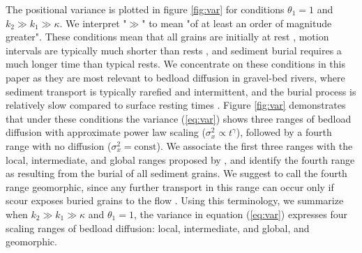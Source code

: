 \documentclass[]{agujournal2018}
\begin{document}
The positional variance is plotted in figure \ref{fig:var} for conditions $\theta_1=1$ and $k_2\gg k_1 \gg \kappa$.
We interpret "$\gg$" to mean "of at least an order of magnitude greater".
These conditions mean that all grains are initially at rest \citep[cf.][]{Wu2019}, motion intervals are typically much shorter than rests \citep[cf.][]{Einstein1937}, and sediment burial requires a much longer time than typical rests.
We concentrate on these conditions in this paper as they are most relevant to bedload diffusion in gravel-bed rivers, where sediment transport is typically rarefied and intermittent, and the burial process is relatively slow compared to surface resting times \citep[e.g.][]{Ferguson2002,Hassan1994}.
Figure \ref{fig:var} demonstrates that under these conditions the variance (\ref{eq:var}) shows three ranges of bedload diffusion with approximate power law scaling ($\sigma_x^2 \propto t^\gamma$), followed by a fourth range with no diffusion ($\sigma_x^2 = \text{const}$). We associate the first three ranges with the local, intermediate, and global ranges proposed by \citet{Nikora2001a,Nikora2002}, and identify the fourth range as resulting from the burial of all sediment grains.
We suggest to call the fourth range geomorphic, since any further transport in this range can occur only if scour exposes buried grains to the flow \citep[cf.][]{Nakagawa1980,Voepel2013,Martin2014}.
Using this terminology, we summarize when $k_2\gg k_1 \gg \kappa$ and $\theta_1=1$, the variance in equation (\ref{eq:var}) expresses four scaling ranges of bedload diffusion: local, intermediate, and global, and geomorphic.
\end{document}
